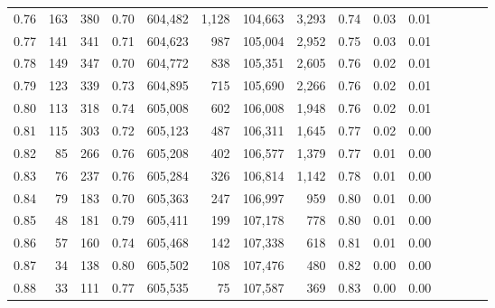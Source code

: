 \begin{tabular}{rrrcrrrrrrrrrrr}
0.76 &     163 &    380 &                                       0.70 &  604,482 &    1,128 &  104,663 &    3,293 &  0.74 &  0.03 &                         0.01 \\
0.77 &     141 &    341 &                                       0.71 &  604,623 &      987 &  105,004 &    2,952 &  0.75 &  0.03 &                         0.01 \\
0.78 &     149 &    347 &                                       0.70 &  604,772 &      838 &  105,351 &    2,605 &  0.76 &  0.02 &                         0.01 \\
0.79 &     123 &    339 &                                       0.73 &  604,895 &      715 &  105,690 &    2,266 &  0.76 &  0.02 &                         0.01 \\
0.80 &     113 &    318 &                                       0.74 &  605,008 &      602 &  106,008 &    1,948 &  0.76 &  0.02 &                         0.01 \\
0.81 &     115 &    303 &                                       0.72 &  605,123 &      487 &  106,311 &    1,645 &  0.77 &  0.02 &                         0.00 \\
0.82 &      85 &    266 &                                       0.76 &  605,208 &      402 &  106,577 &    1,379 &  0.77 &  0.01 &                         0.00 \\
0.83 &      76 &    237 &                                       0.76 &  605,284 &      326 &  106,814 &    1,142 &  0.78 &  0.01 &                         0.00 \\
0.84 &      79 &    183 &                                       0.70 &  605,363 &      247 &  106,997 &      959 &  0.80 &  0.01 &                         0.00 \\
0.85 &      48 &    181 &                                       0.79 &  605,411 &      199 &  107,178 &      778 &  0.80 &  0.01 &                         0.00 \\
0.86 &      57 &    160 &                                       0.74 &  605,468 &      142 &  107,338 &      618 &  0.81 &  0.01 &                         0.00 \\
0.87 &      34 &    138 &                                       0.80 &  605,502 &      108 &  107,476 &      480 &  0.82 &  0.00 &                         0.00 \\
0.88 &      33 &    111 &                                       0.77 &  605,535 &       75 &  107,587 &      369 &  0.83 &  0.00 &                         0.00 \\

\end{tabular}
